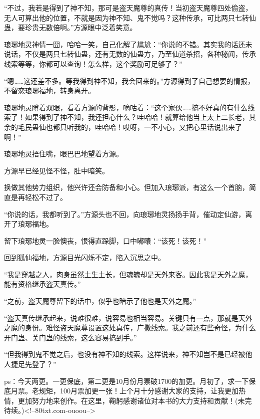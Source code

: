 \begin{this_body}
“不过，我若是得到了神不知，那可是盗天魔尊的真传！当初盗天魔尊四处偷盗，无人可算出他的位置，不就是因为神不知、鬼不觉吗？这种传承，可比两只七转仙蛊，要珍贵无数倍啊。”方源眼中泛着笑意。

琅琊地灵神情一囧，哈哈一笑，自己化解了尴尬：“你说的不错。其实我的话还未说话，不仅是两只七转仙蛊，还有无数的仙蛊方，乃至仙道杀招，各种秘闻，传承线索等等，你都可以查询！怎么样，这个奖励可足够了？”

“嗯……这还差不多。等我得到神不知，我会回来的。”方源得到了自己想要的情报，不留恋琅琊福地，转身离开。

琅琊地灵瞪着双眼，看着方源的背影，嘀咕着：“这个家伙……搞不好真的有什么线索了！如果得到了神不知，我还担心什么？哇哈哈！就算给他当上太上二长老，其余的毛民蛊仙也都只听我的，哇哈哈！哎呀，一不小心，又把心里话说出来了啊！”

琅琊地灵捂住嘴，眼巴巴地望着方源。

方源早已经见怪不怪，肚中暗笑。

换做其他势力组织，他兴许还会防备和小心。但加入琅琊派，有这么一个首脑，简直是再轻松不过了。

“你说的话，我都听到了。”方源头也不回，向琅琊地灵扬扬手背，催动定仙游，离开了琅琊福地。

留下琅琊地灵一脸懊丧，恨得直跺脚，口中嘟囔：“该死！该死！”

回到狐仙福地，方源目光闪烁不定，陷入沉思之中。

“我是穿越之人，肉身虽然土生土长，但魂魄却是天外来客。因此我是天外之魔，能有资格继承盗天真传。”

“之前，盗天魔尊留下的话中，似乎也暗示了他也是天外之魔。”

“盗天真传继承起来，说难很难，说容易也相当容易。关键只有一点，那就是天外之魔的身份。难怪盗天魔尊设置这处真传，广撒线索。我之前还有些奇怪，为什么开门蛊、关门蛊的线索，这么容易搞到手。”

“但我得到鬼不觉之后，也没有神不知的线索。这样说来，神不知岂不是已经被他人捷足先登了？”

ps：今天两更。一更保底，第二更是10月份月票破1700的加更。月初了，求一下保底月票。老规矩，100月票加更一张！上个月十分感谢大家的支持，让我更加热情，更加努力地来创作。在这里，鞠躬感谢诸位对本书的大力支持和贡献！(未完待续。)<!--80txt.com-ouoou-->

\end{this_body}

